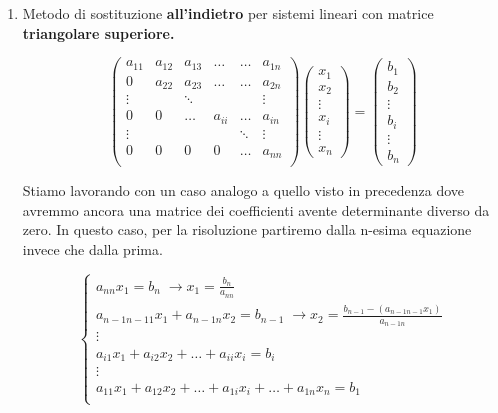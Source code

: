 \documentclass[12pt, a4paper]{book}
\theoremstyle{definition}
\begin{document}
\begin{flushleft}
\begin{enumerate}
	\item Metodo di sostituzione \textbf{all'indietro} per sistemi lineari con matrice \textbf{triangolare superiore.}
	
	\[
		\begin{pmatrix}
			a_{11} & a_{12} & a_{13} & \dots & \dots & a_{1n} \\
			0  & a_{22} & a_{23} &  \dots & \dots & a_{2n} \\
			\vdots & & \ddots &  & & \vdots \\
			0 & 0 & \dots & a_{ii} &  \dots & a_{in} \\
			\vdots & & & & \ddots &   \vdots \\
			0 & 0 & 0 & 0 &  \dots & a_{nn} \\
		\end{pmatrix}
		\begin{pmatrix}
			x_{1}  \\
			x_{2}  \\
			\vdots  \\
			x_{i}  \\
			\vdots  \\
			x_{n}
		\end{pmatrix}
		=
		\begin{pmatrix}
			b_{1}  \\
			b_{2}  \\
			\vdots  \\
			b_{i}  \\
			\vdots  \\
			b_{n}
		\end{pmatrix}
	\]	
	
	Stiamo lavorando con un caso analogo a quello visto in precedenza dove avremmo ancora una matrice dei coefficienti avente determinante diverso da zero. In questo caso, per la risoluzione partiremo dalla n-esima equazione invece che dalla prima.
	
	\[ 
		\begin{cases}
				a_{nn}x_{1} = b_{n} \; \longrightarrow x_{1} = \frac{b_{n}}{a_{nn}} \\   
				a_{n-1n-11}x_{1} + a_{n-1n}x_{2} = b_{n-1} \; \longrightarrow x_{2} = \frac{b_{n-1}-( a_{n-1n-1}x_{1})}{a_{n-1n}}  \\
				\vdots \\
				a_{i1}x_{1} + a_{i2}x_{2}  + \dots + a_{ii}x_{i} = b_{i} \\
				\vdots \\
				a_{11}x_{1} + a_{12}x_{2}  + \dots + a_{1i}x_{i} + \dots + a_{1n}x_{n} = b_{1} \\
		\end{cases}	
	\]
	

\end{enumerate}
\end{flushleft}
\end{document}
